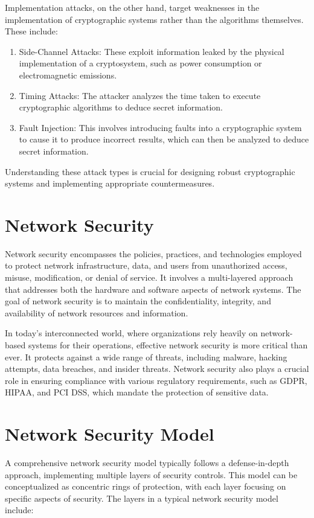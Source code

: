 \documentclass{article}
\begin{document}
Implementation attacks, on the other hand, target weaknesses in the implementation of cryptographic systems rather than the algorithms themselves. These include:

\begin{enumerate}
    \item Side-Channel Attacks: These exploit information leaked by the physical implementation of a cryptosystem, such as power consumption or electromagnetic emissions.
    \item Timing Attacks: The attacker analyzes the time taken to execute cryptographic algorithms to deduce secret information.
    \item Fault Injection: This involves introducing faults into a cryptographic system to cause it to produce incorrect results, which can then be analyzed to deduce secret information.
\end{enumerate}

Understanding these attack types is crucial for designing robust cryptographic systems and implementing appropriate countermeasures.

\section{Network Security}

Network security encompasses the policies, practices, and technologies employed to protect network infrastructure, data, and users from unauthorized access, misuse, modification, or denial of service. It involves a multi-layered approach that addresses both the hardware and software aspects of network systems. The goal of network security is to maintain the confidentiality, integrity, and availability of network resources and information.

In today's interconnected world, where organizations rely heavily on network-based systems for their operations, effective network security is more critical than ever. It protects against a wide range of threats, including malware, hacking attempts, data breaches, and insider threats. Network security also plays a crucial role in ensuring compliance with various regulatory requirements, such as GDPR, HIPAA, and PCI DSS, which mandate the protection of sensitive data.

\section{Network Security Model}

A comprehensive network security model typically follows a defense-in-depth approach, implementing multiple layers of security controls. This model can be conceptualized as concentric rings of protection, with each layer focusing on specific aspects of security. The layers in a typical network security model include:
\end{document}
